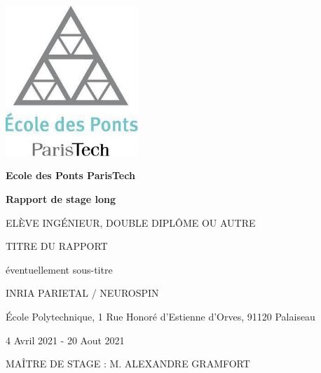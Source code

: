 \begin{titlepage}
    \begin{center}
        
        
        \includegraphics[width=5cm]{preliminaries/images/logo_ponts.jpg}
        
        \vspace{0.5cm}
        
        \textbf{Ecole des Ponts ParisTech}

        \vspace{1.5cm}
        
        \textbf{\Large Rapport de stage long}
        
        \vspace{0.5cm}
        
        \MakeUppercase{\theauthor{}}
        
        \MakeUppercase{Elève ingénieur, double diplôme ou autre}
        
        \vspace{1.5cm}
        
        \MakeUppercase{Titre du rapport}
        
        éventuellement sous-titre
    
        
        
        
        \vfill
        
        \MakeUppercase{INRIA Parietal / Neurospin}
        
        École Polytechnique, 1 Rue Honoré d'Estienne d'Orves, 91120 Palaiseau
        
        4 Avril 2021 - 20 Aout 2021
        
        \MakeUppercase{Maître de stage : M. Alexandre Gramfort}
        


        
    
        
    \end{center}
\end{titlepage}
